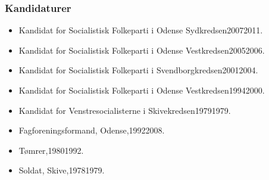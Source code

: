 \documentclass[11pt, a4paper]{awesome-cv}
\begin{document}
\begin{cvletter}
\subsubsection*{Kandidaturer}
\begin{itemize}
\item Kandidat for Socialistisk Folkeparti i Odense Sydkredsen20072011.
\item Kandidat for Socialistisk Folkeparti i Odense Vestkredsen20052006.
\item Kandidat for Socialistisk Folkeparti i Svendborgkredsen20012004.
\item Kandidat for Socialistisk Folkeparti i Odense Vestkredsen19942000.
\item Kandidat for Venstresocialisterne i Skivekredsen19791979.
\end{itemize}
\begin{itemize}
\item Fagforeningsformand, Odense,19922008.
\item Tømrer,19801992.
\item Soldat, Skive,19781979.
\end{itemize}
\end{cvletter}
\end{document}
